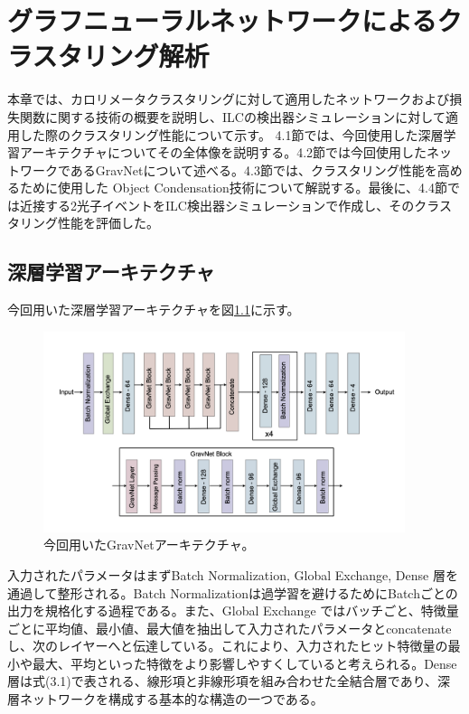 
\chapter{グラフニューラルネットワークによるクラスタリング解析} \label{sec:BeamTest}

本章では、カロリメータクラスタリングに対して適用したネットワークおよび損失関数に関する技術の概要を説明し、ILCの検出器シミュレーションに対して適用した際のクラスタリング性能について示す。
4.1節では、今回使用した深層学習アーキテクチャについてその全体像を説明する。4.2節では今回使用したネットワークであるGravNetについて述べる。4.3節では、クラスタリング性能を高めるために使用した Object Condensation技術について解説する。最後に、4.4節では近接する2光子イベントをILC検出器シミュレーションで作成し、そのクラスタリング性能を評価した。

\section{深層学習アーキテクチャ}
今回用いた深層学習アーキテクチャを図\ref{GravArc}に示す。
\begin{figure}[H]
	\begin{center}
		\includegraphics[width=300pt]{./Figure/DLAnalysis/GravArc.png}
		\caption[用いたGravNetアーキテクチャ]{今回用いたGravNetアーキテクチャ。}
		\label{GravArc}
	\end{center}
\end{figure}

入力されたパラメータはまずBatch Normalization, Global Exchange, Dense 層を通過して整形される。Batch Normalizationは過学習を避けるためにBatchごとの出力を規格化する過程である。また、Global Exchange ではバッチごと、特徴量ごとに平均値、最小値、最大値を抽出して入力されたパラメータとconcatenateし、次のレイヤーへと伝達している。これにより、入力されたヒット特徴量の最小や最大、平均といった特徴をより影響しやすくしていると考えられる。Dense層は式(3.1)で表される、線形項と非線形項を組み合わせた全結合層であり、深層ネットワークを構成する基本的な構造の一つである。

